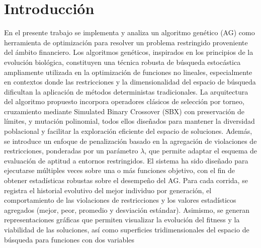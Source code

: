 \chapter{Introducción}
En el presente trabajo se implementa y analiza un algoritmo genético (AG) como herramienta de optimización para resolver un problema restringido proveniente del ámbito financiero. Los algoritmos genéticos, inspirados en los principios de la evolución biológica, constituyen una técnica robusta de búsqueda estocástica ampliamente utilizada en la optimización de funciones no lineales, especialmente en contextos donde las restricciones y la dimensionalidad del espacio de búsqueda dificultan la aplicación de métodos deterministas tradicionales.
La arquitectura del algoritmo propuesto incorpora operadores clásicos de selección por torneo, cruzamiento mediante Simulated Binary Crossover (SBX) con preservación de límites, y mutación polinomial, todos ellos diseñados para mantener la diversidad poblacional y facilitar la exploración eficiente del espacio de soluciones. Además, se introduce un enfoque de penalización basado en la agregación de violaciones de restricciones, ponderadas por un parámetro $\lambda$, que permite adaptar el esquema de evaluación de aptitud a entornos restringidos.
El sistema ha sido diseñado para ejecutarse múltiples veces sobre una o más funciones objetivo, con el fin de obtener estadísticas robustas sobre el desempeño del AG. Para cada corrida, se registra el historial evolutivo del mejor individuo por generación, el comportamiento de las violaciones de restricciones y los valores estadísticos agregados (mejor, peor, promedio y desviación estándar). Asimismo, se generan representaciones gráficas que permiten visualizar la evolución del fitness y la viabilidad de las soluciones, así como superficies tridimensionales del espacio de búsqueda para funciones con dos variables
